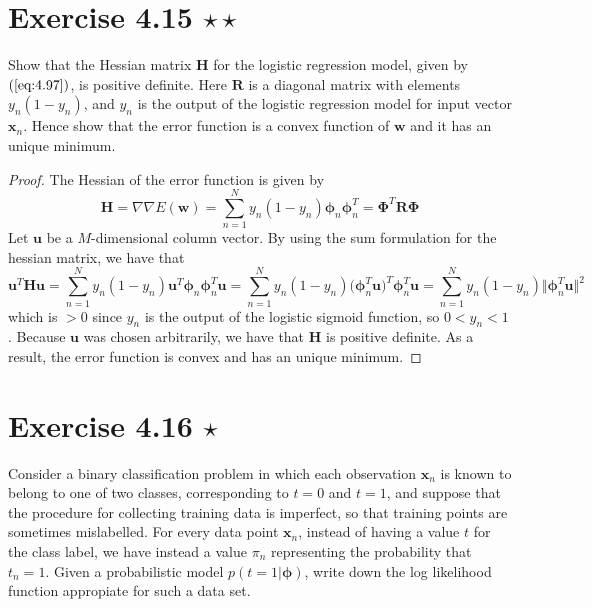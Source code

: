 \section*{Exercise 4.15 $\star \star$}
Show that the Hessian matrix $\mathbf{H}$ for the logistic regression
model, given by $(\ref{eq:4.97})$, is positive definite. Here $\mathbf{R}$
is a diagonal matrix with elements $y_n(1 - y_n)$, and $y_n$ is
the output of the logistic regression model for input vector $\mathbf{x}_n$.
Hence show that the error function is a convex function of $\mathbf{w}$
and it has an unique minimum.

\vspace{1em}

\begin{proof}
    The Hessian of the error function is given by
    \begin{equation*}
        \mathbf{H} 
        = \nabla \nabla E(\mathbf{w})
        = \sum_{n=1}^{N} y_n(1 - y_n)\bm{\phi}_n\bm{\phi}_n^T
        = \mathbf{\Phi}^T\mathbf{R}\mathbf{\Phi}
        \tag{4.97}\label{eq:4.97}
    \end{equation*}
    Let $\mathbf{u}$ be a $M$-dimensional column vector.
    By using the sum formulation for the hessian matrix, we have that
    \[
        \mathbf{u}^T\mathbf{H}\mathbf{u} 
        = \sum_{n=1}^{N} y_n(1 - y_n)\mathbf{u}^T\bm{\phi}_n\bm{\phi}_n^T\mathbf{u}
        = \sum_{n=1}^{N} y_n(1 - y_n) \big(\bm{\phi}_n^T\mathbf{u}\big)^T \bm{\phi}_n^T\mathbf{u}
        = \sum_{n=1}^{N} y_n(1 - y_n) \Vert\bm{\phi}_n^T \mathbf{u}\Vert^2
    \] 
    which is $>0$ since $y_n$ is the output of the logistic sigmoid function,
    so $0 < y_n < 1$. Because $\mathbf{u}$ was chosen arbitrarily, we have that
    $\mathbf{H}$ is positive definite. As a result, the error function is convex and has an unique
    minimum.
\end{proof}

\section*{Exercise 4.16 $\star$}
Consider a binary classification problem in which each observation
$\mathbf{x}_n$ is known to belong to one of two classes, corresponding to $t=0$
and $t=1$, and suppose that the procedure for collecting training data
is imperfect, so that training points are sometimes mislabelled. For
every data point $\mathbf{x}_n$, instead of having a value $t$ for
the class label, we have instead a value $\pi_n$ representing the
probability that $t_n = 1$. Given a probabilistic model $p(t = 1 | \bm{\phi})$,
write down the log likelihood function appropiate for such a data set.


